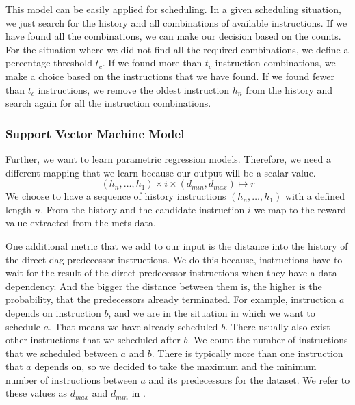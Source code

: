 This model can be easily applied for scheduling.
In a given scheduling situation, we just search for the history and all combinations of available instructions.
If we have found all the combinations, we can make our decision based on the counts.
For the situation where we did not find all the required combinations, we define a percentage threshold $t_c$.
If we found more than $t_c$ instruction combinations, we make a choice based on the instructions that we have found.
If we found fewer than $t_c$ instructions, we remove the oldest instruction $h_n$ from the history and search again for all the instruction combinations. 

\subsubsection{Support Vector Machine Model}
Further, we want to learn parametric regression models.
Therefore, we need a different mapping that we learn because our output will be a scalar value.
\begin{equation}
    (h_n, \ldots, h_1) \times i \times (d_{min}, d_{max}) \mapsto r
    \label{eqn:approach:regression-mapping}
\end{equation}
We choose to have a sequence of history instructions $(h_n, \ldots, h_1)$ with a defined length $n$.
From the history and the candidate instruction $i$ we map to the reward value extracted from the \ac{mcts} data.

One additional metric that we add to our input is the distance into the history of the direct \ac{dag} predecessor instructions.
We do this because, instructions have to wait for the result of the direct predecessor instructions when they have a data dependency.
And the bigger the distance between them is, the higher is the probability, that the predecessors already terminated. 
For example, instruction $a$ depends on instruction $b$, and we are in the situation in which we want to schedule $a$.
That means we have already scheduled $b$.
There usually also exist other instructions that we scheduled after $b$.
We count the number of instructions that we scheduled between $a$ and $b$.
There is typically more than one instruction that $a$ depends on, so we decided to take the maximum and the minimum number of instructions between $a$ and its predecessors for the dataset.
We refer to these values as $d_{max}$ and $d_{min}$ in .

